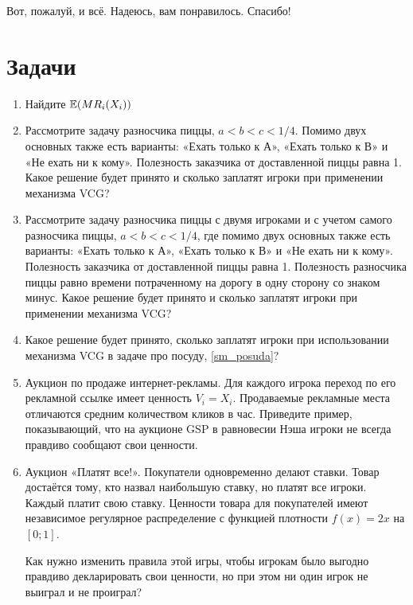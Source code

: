 Вот, пожалуй, и всё. Надеюсь, вам понравилось. Спасибо!



\section{Задачи}

\begin{enumerate}
\item Найдите $ \mathbb{E}(MR_{i}(X_{i})) $

\item Рассмотрите задачу разносчика пиццы, $ a<b<c<1/4 $. Помимо двух основных также есть варианты: «Ехать только к А», «Ехать только к В» и «Не ехать ни к кому». Полезность заказчика от доставленной пиццы равна 1. Какое решение будет принято и сколько заплатят игроки при применении механизма VCG?

\item Рассмотрите задачу разносчика пиццы с двумя игроками и с учетом самого разносчика пиццы, $ a<b<c<1/4 $, где помимо двух основных также есть варианты: «Ехать только к А», «Ехать только к В» и «Не ехать ни к кому». Полезность заказчика от доставленной пиццы равна 1. Полезность разносчика пиццы равно времени потраченному на дорогу в одну сторону со знаком минус. Какое решение будет принято и сколько заплатят игроки при применении механизма VCG?

\item Какое решение будет принято, сколько заплатят игроки при использовании механизма VCG в задаче про посуду, \ref{sm_posuda}?

\item Аукцион по продаже интернет-рекламы. Для каждого игрока переход по его рекламной ссылке имеет ценность $ V_{i}=X_{i} $. Продаваемые рекламные места отличаются средним количеством кликов в час. Приведите пример, показывающий, что на аукционе GSP в равновесии Нэша игроки не всегда правдиво сообщают свои ценности.

\item Аукцион «Платят все!». Покупатели одновременно делают ставки. Товар достаётся
тому, кто назвал наибольшую ставку, но платят все игроки. Каждый платит свою
ставку. Ценности товара для покупателей имеют независимое регулярное распределение с функцией плотности $ f(x)=2x $ на $ [0;1] $.

Как нужно изменить правила этой игры, чтобы игрокам было выгодно правдиво декларировать свои ценности, но при этом ни один игрок не выиграл и не проиграл?


\end{enumerate}
